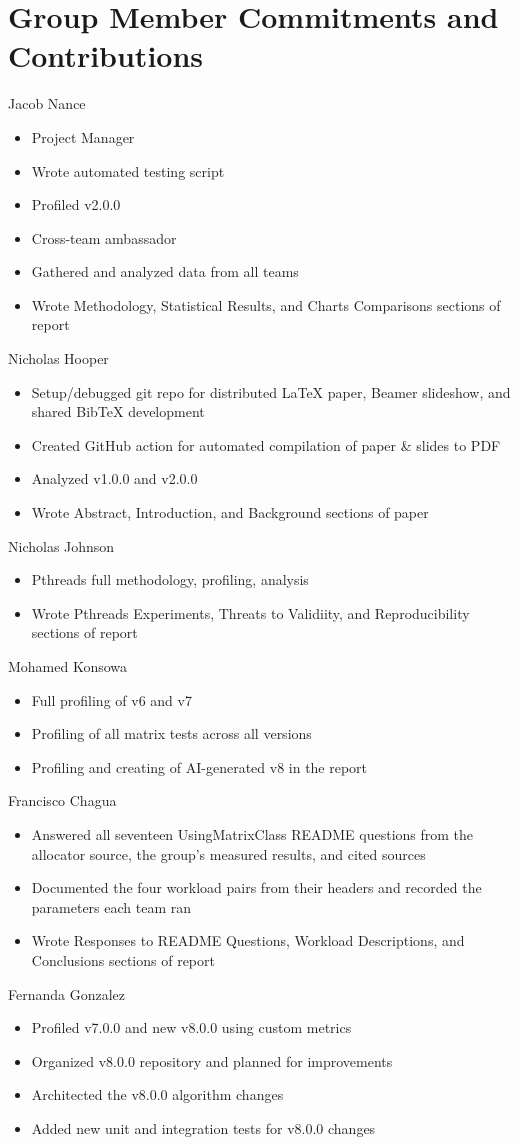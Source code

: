 \section{Group Member Commitments and Contributions}
\label{sec:contributions}

\noindent Jacob Nance
\begin{itemize}
  \item Project Manager
  \item Wrote automated testing script
  \item Profiled v2.0.0
  \item Cross-team ambassador
  \item Gathered and analyzed data from all teams
  \item Wrote Methodology, Statistical Results, and Charts Comparisons sections
    of report
\end{itemize}

\noindent Nicholas Hooper
\begin{itemize}
  \item Setup/debugged git repo for distributed LaTeX paper, Beamer slideshow,
    and shared BibTeX development
  \item Created GitHub action for automated compilation of paper \& slides to
    PDF
  \item Analyzed v1.0.0 and v2.0.0
  \item Wrote Abstract, Introduction, and Background sections of paper
\end{itemize}

\noindent Nicholas Johnson
\begin{itemize}
  \item Pthreads full methodology, profiling, analysis
  \item Wrote Pthreads Experiments, Threats to Validiity, and Reproducibility
    sections of report
\end{itemize}

\noindent Mohamed Konsowa
\begin{itemize}
  \item Full profiling of v6 and v7
  \item Profiling of all matrix tests across all versions
  \item Profiling and creating of AI-generated v8 in the report
\end{itemize}

\noindent Francisco Chagua
\begin{itemize}
  \item Answered all seventeen UsingMatrixClass README questions from the
    allocator source, the group's measured results, and cited sources
  \item Documented the four workload pairs from their headers and recorded the
    parameters each team ran
  \item Wrote Responses to README Questions, Workload Descriptions, and
    Conclusions sections of report
\end{itemize}

\noindent Fernanda Gonzalez
\begin{itemize}
  \item Profiled v7.0.0 and new v8.0.0 using custom metrics
  \item Organized v8.0.0 repository and planned for improvements
  \item Architected the v8.0.0 algorithm changes
  \item Added new unit and integration tests for v8.0.0 changes
\end{itemize}
